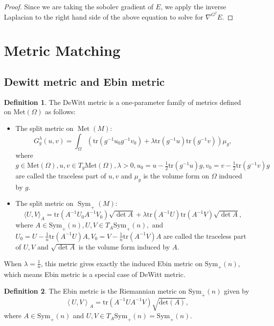 \documentclass{article}
\theoremstyle{definition}
\newtheorem{definition}{Definition}
\theoremstyle{plain}
\begin{document}
\begin{proof}
Since we are taking the sobolev gradient of $E$, we apply the inverse Laplacian to the right hand side of the above equation to solve for $\nabla^{G^I}E$.
\end{proof}

\section{Metric Matching}
\subsection{Dewitt metric and Ebin metric}
\begin{definition}
The DeWitt metric is a one-parameter family of metrics defined on $\mathrm{Met}(\Omega)$ as follows:
\begin{itemize}
    \item The split metric on $\operatorname{Met}(M)$:
    \begin{equation*}
    G^\lambda_g(u,v)=\int_\Omega\left(\mathrm{tr}(g^{-1}u_0g^{-1}v_0)+\lambda\mathrm{tr}(g^{-1}u)\mathrm{tr}(g^{-1}v)\right)\mu_g,
    \end{equation*}where $g\in\mathrm{Met}(\Omega), u,v\in T_g\mathrm{Met}(\Omega), \lambda>0, u_0=u-\frac{1}{2}\mathrm{tr}(g^{-1}u)g, v_0=v-\frac{1}{2}\mathrm{tr}(g^{-1}v)g$ are called the traceless part of $u,v$ and $\mu_g$ is the volume form on $\Omega$ induced by $g$.
    \item The split metric on $\operatorname{Sym}_+(M)$:
    \begin{equation*}
    \langle U,V\rangle_A=\mathrm{tr}(A^{-1}U_0A^{-1}V_0)\sqrt{\det A}+\lambda\mathrm{tr}(A^{-1}U)\mathrm{tr}(A^{-1}V)\sqrt{\det A},
    \end{equation*}
    where $A\in\mathrm{Sym}_+(n), U,V\in T_A\mathrm{Sym}_+(n),$ and $U_0=U-\frac{1}{n}\mathrm{tr}(A^{-1}U)A,  V_0=V-\frac{1}{n}\mathrm{tr}(A^{-1}V)A$ are called the traceless part of $U,V$ and $\sqrt{\det A}$ is the volume form induced by $A$.
\end{itemize}
\end{definition}

When $\lambda=\frac{1}{n}$, this metric gives exactly the induced Ebin metric on $\mathrm{Sym}_+(n)$, which means Ebin metric is a special case of DeWitt metric.

\begin{definition}
The Ebin metric is the Riemannian metric on $\mathrm{Sym}_+(n)$ given by
\begin{equation*}
    \left<U,V\right>_A=\mathrm{tr}(A^{-1}UA^{-1}V)\sqrt{\mathrm{det}(A)},
\end{equation*}
where $A\in\mathrm{Sym}_+(n)$ and $U,V\in T_A\mathrm{Sym}_+(n)=\mathrm{Sym}_+(n)$.
\end{definition}
\end{document}
